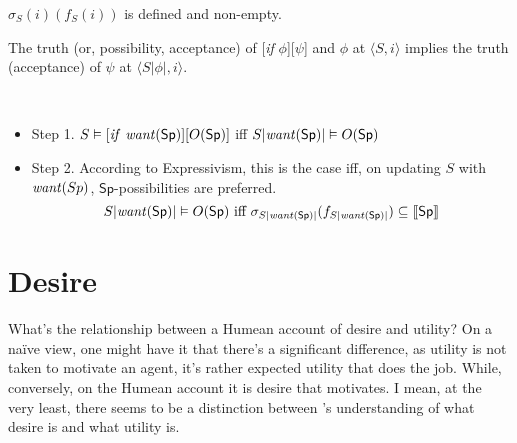 \documentclass[10pt]{article}
\newcommand{\sem}[1]{\ensuremath{[\kern-.5mm[{#1}]\kern-.5mm]}}
\begin{document}
\begin{assumption}[Definedness]
  \(\sigma_{S}(i)(f_{S}(i))\) is defined and non-empty.
\end{assumption}

\begin{assumption}
  The truth (or, possibility, acceptance) of [\emph{if} \(\phi\)][\(\psi\)] and \(\phi\) at \(\langle S,i \rangle\) implies the truth (acceptance) of \(\psi\) at \(\langle S|\phi|,i \rangle\).
\end{assumption}



\begin{definition}\mbox{ }
  \begin{itemize}[label=-]
  \item Step 1. \(S \vDash [\text{\emph{if} }\text{\emph{want}}(\mathsf{Sp})][O(\mathsf{Sp})]\) iff \(S|\text{\emph{want}}(\mathsf{Sp})| \vDash O(\mathsf{Sp})\)
  \item Step 2. According to Expressivism, this is the case iff, on updating \(S\) with \(\text{\emph{want}}(Sp)\), \(\mathsf{Sp}\)-possibilities are preferred.
    \[S|\text{\emph{want}}(\mathsf{Sp})| \vDash O(\mathsf{Sp})\text{ iff } \sigma_{S|\text{\emph{want}}(\mathsf{Sp})|}(f_{S|\text{\emph{want}}(\mathsf{Sp})|}) \subseteq \sem{\mathsf{Sp}}\]
  \end{itemize}
\end{definition}


\section{Desire}
\label{sec:desire}

What's the relationship between a Humean account of desire and utility?
On a na\"{i}ve view, one might have it that there's a significant difference, as utility is not taken to motivate an agent, it's rather expected utility that does the job.
While, conversely, on the Humean account it is desire that motivates.
I mean, at the very least, there seems to be a distinction between \citeauthor{Sinhababu:2013aa}'s understanding of what desire is and what utility is.
\end{document}
